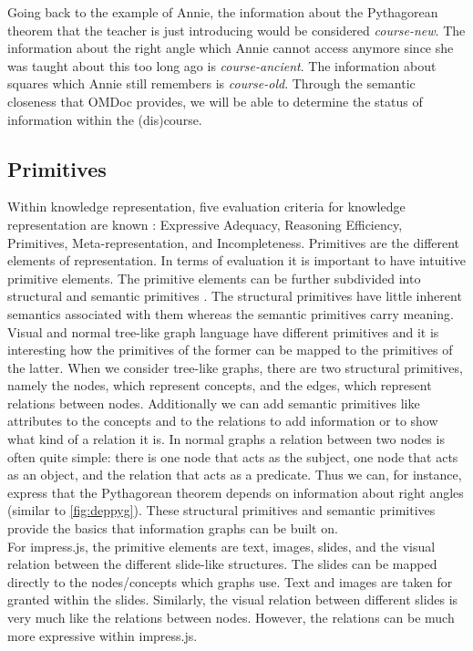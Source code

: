 \documentclass[twoside, 12pt]{article}
\begin{document}
Going back to the example of Annie, the information about the Pythagorean theorem that the teacher is just introducing would be considered \textit{course-new}. The information about the right angle which Annie cannot access anymore since she was taught about this too long ago is \textit{course-ancient}. The information about squares which Annie still remembers is \textit{course-old}. Through the semantic closeness that OMDoc provides, we will be able to determine the status of information within the (dis)course.

\subsection{Primitives}
\label{sec:primitives}

Within knowledge representation, five evaluation criteria for knowledge representation are known \cite{Kohlhase:Complog:base}: Expressive Adequacy, Reasoning Efficiency, Primitives, Meta-representation, and Incompleteness. Primitives are the different elements of representation. In terms of evaluation it is important to have intuitive primitive elements. The primitive elements can be further subdivided into structural and semantic primitives \cite{DBLP:dblp_conf/acl/Salveter80}. The structural primitives have little inherent semantics associated with them whereas the semantic primitives carry meaning.\\

Visual and normal tree-like graph language have different primitives and it is interesting how the primitives of the former can be mapped to the primitives of the latter. When we consider tree-like graphs, there are two structural primitives, namely the nodes, which represent concepts, and the edges, which represent relations between nodes. Additionally we can add semantic primitives like attributes to the concepts and to the relations to add information or to show what kind of a relation it is. In normal graphs a relation between two nodes is often quite simple: there is one node that acts as the subject, one node that acts as an object, and the relation that acts as a predicate. Thus we can, for instance, express that the Pythagorean theorem depends on information about right angles (similar to \autoref{fig:deppyg}). These structural primitives and semantic primitives provide the basics that information graphs can be built on.\\

For impress.js, the primitive elements are text, images, slides, and the visual relation between the different slide-like structures. The slides can be mapped directly to the nodes/concepts which graphs use. Text and images are taken for granted within the slides. Similarly, the visual relation between different slides is very much like the relations between nodes. However, the relations can be much more expressive within impress.js.\\
\end{document}
